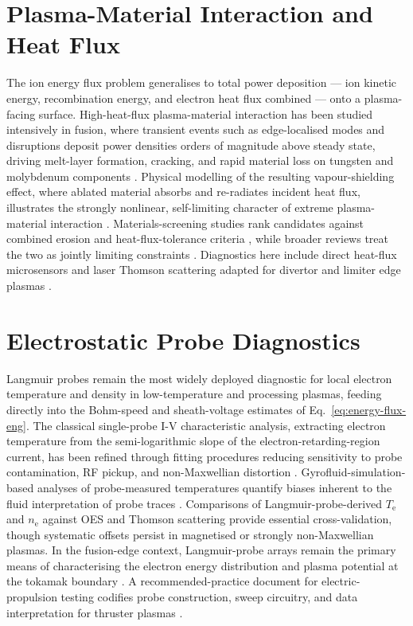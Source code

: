 \section{Plasma-Material Interaction and Heat Flux}

The ion energy flux problem generalises to total power deposition — ion kinetic energy, recombination energy, and electron heat flux combined — onto a plasma-facing surface. High-heat-flux plasma-material interaction has been studied intensively in fusion, where transient events such as edge-localised modes and disruptions deposit power densities orders of magnitude above steady state, driving melt-layer formation, cracking, and rapid material loss on tungsten and molybdenum components \cite{ref0581}. Physical modelling of the resulting vapour-shielding effect, where ablated material absorbs and re-radiates incident heat flux, illustrates the strongly nonlinear, self-limiting character of extreme plasma-material interaction \cite{ref0176}. Materials-screening studies rank candidates against combined erosion and heat-flux-tolerance criteria \cite{ref0189}, while broader reviews treat the two as jointly limiting constraints \cite{ref0190}. Diagnostics here include direct heat-flux microsensors \cite{ref0175} and laser Thomson scattering adapted for divertor and limiter edge plasmas \cite{ref0383}.

\section{Electrostatic Probe Diagnostics}

Langmuir probes remain the most widely deployed diagnostic for local electron temperature and density in low-temperature and processing plasmas, feeding directly into the Bohm-speed and sheath-voltage estimates of Eq.~\eqref{eq:energy-flux-eng}. The classical single-probe I-V characteristic analysis, extracting electron temperature from the semi-logarithmic slope of the electron-retarding-region current, has been refined through fitting procedures reducing sensitivity to probe contamination, RF pickup, and non-Maxwellian distortion \cite{ref0217}. Gyrofluid-simulation-based analyses of probe-measured temperatures quantify biases inherent to the fluid interpretation of probe traces \cite{ref0194}. Comparisons of Langmuir-probe-derived $T_{\mathrm{e}}$ and $n_{\mathrm{e}}$ against OES \cite{ref0237} and Thomson scattering \cite{ref0355} provide essential cross-validation, though systematic offsets persist in magnetised or strongly non-Maxwellian plasmas. In the fusion-edge context, Langmuir-probe arrays remain the primary means of characterising the electron energy distribution and plasma potential at the tokamak boundary \cite{ref0213}. A recommended-practice document for electric-propulsion testing codifies probe construction, sweep circuitry, and data interpretation for thruster plasmas \cite{ref0226}.

